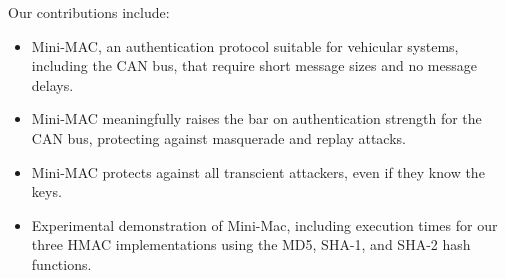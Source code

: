 Our contributions include:
\begin{itemize}

\item Mini-MAC, an authentication protocol suitable for vehicular systems, including the CAN bus, 
that require short message sizes and no message delays.

\item Mini-MAC meaningfully raises the bar on authentication strength for the CAN bus, protecting against
masquerade and replay attacks.

\item Mini-MAC protects against all transcient attackers, even if they know the keys.

\item Experimental demonstration of Mini-Mac, including execution times for our three HMAC
implementations using the MD5, SHA-1, and SHA-2 hash functions.

\end{itemize}